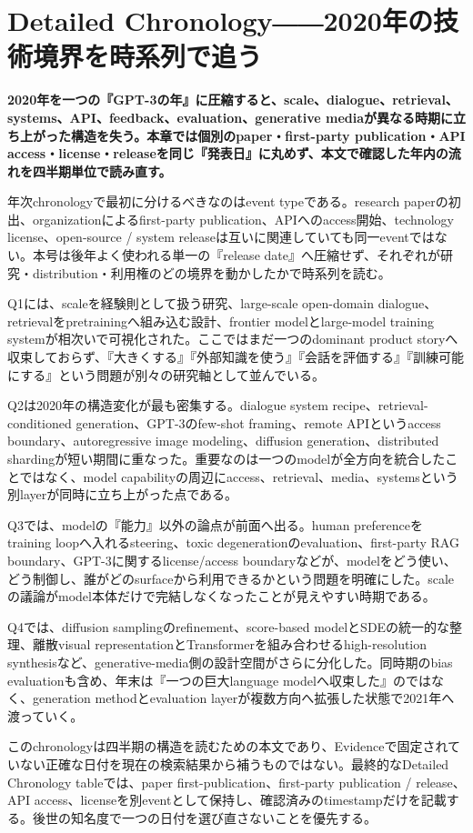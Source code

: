 \section{Detailed Chronology――2020年の技術境界を時系列で追う}
\label{pkg:annual-chronology}
\noindent\textbf{2020年を一つの『GPT-3の年』に圧縮すると、scale、dialogue、retrieval、systems、API、feedback、evaluation、generative mediaが異なる時期に立ち上がった構造を失う。本章では個別のpaper・first-party publication・API access・license・releaseを同じ『発表日』に丸めず、本文で確認した年内の流れを四半期単位で読み直す。}

年次chronologyで最初に分けるべきなのはevent typeである。research paperの初出、organizationによるfirst-party publication、APIへのaccess開始、technology license、open-source / system releaseは互いに関連していても同一eventではない。本号は後年よく使われる単一の『release date』へ圧縮せず、それぞれが研究・distribution・利用権のどの境界を動かしたかで時系列を読む。


Q1には、scaleを経験則として扱う研究、large-scale open-domain dialogue、retrievalをpretrainingへ組み込む設計、frontier modelとlarge-model training systemが相次いで可視化された。ここではまだ一つのdominant product storyへ収束しておらず、『大きくする』『外部知識を使う』『会話を評価する』『訓練可能にする』という問題が別々の研究軸として並んでいる。


Q2は2020年の構造変化が最も密集する。dialogue system recipe、retrieval-conditioned generation、GPT-3のfew-shot framing、remote APIというaccess boundary、autoregressive image modeling、diffusion generation、distributed shardingが短い期間に重なった。重要なのは一つのmodelが全方向を統合したことではなく、model capabilityの周辺にaccess、retrieval、media、systemsという別layerが同時に立ち上がった点である。


Q3では、modelの『能力』以外の論点が前面へ出る。human preferenceをtraining loopへ入れるsteering、toxic degenerationのevaluation、first-party RAG boundary、GPT-3に関するlicense/access boundaryなどが、modelをどう使い、どう制御し、誰がどのsurfaceから利用できるかという問題を明確にした。scaleの議論がmodel本体だけで完結しなくなったことが見えやすい時期である。


Q4では、diffusion samplingのrefinement、score-based modelとSDEの統一的な整理、離散visual representationとTransformerを組み合わせるhigh-resolution synthesisなど、generative-media側の設計空間がさらに分化した。同時期のbias evaluationも含め、年末は『一つの巨大language modelへ収束した』のではなく、generation methodとevaluation layerが複数方向へ拡張した状態で2021年へ渡っていく。


このchronologyは四半期の構造を読むための本文であり、Evidenceで固定されていない正確な日付を現在の検索結果から補うものではない。最終的なDetailed Chronology tableでは、paper first-publication、first-party publication / release、API access、licenseを別eventとして保持し、確認済みのtimestampだけを記載する。後世の知名度で一つの日付を選び直さないことを優先する。
